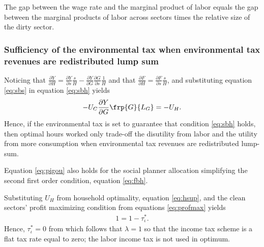 The gap between the wage rate and the marginal product of labor equals the gap between the marginal products of labor across sectors times the relative size of the dirty sector. 

\subsubsection{Sufficiency of the environmental tax when environmental tax revenues are redistributed lump sum}\label{app:incometax0}

Noticing that $\frac{\partial Y}{\partial H}= \frac{\partial Y}{\partial s}\frac{s}{H}-\frac{\partial Y}{\partial G}\frac{\partial G}{\partial s}\frac{1}{H}$ and that $\frac{\partial F}{\partial H}=\frac{\partial F}{\partial s}\frac{s}{H}$, and substituting equation \ref{eq:sbs} in equation \ref{eq:sbh} yields
\begin{align}\label{eq:pigou}
-U_C \frac{\partial Y}{\partial G}\frp{G}{L_G}=-U_H.
\end{align}
Hence, if the environmental tax is set to guarantee that condition \ref{eq:sbh} holds, then optimal hours worked only trade-off the disutility from labor and the utility from more consumption when environmental tax revenues are redistributed lump-sum.

Equation \ref{eq:pigou} also holds for the social planner allocation simplifying the second first order condition, equation \ref{eq:fbh}.


Substituting $U_H$ from household optimality, equation \ref{eq:hsup}, and the clean sectors' profit maximizing condition from equations \ref{eq:profmax} yields
\begin{align}
1=1-\tau^*_\iota.
\end{align}
Hence, $\tau^*_\iota =0$ from which follows that $\lambda =1$ so that the income tax scheme is a flat tax rate equal to zero; the labor income tax is not used in optimum.

%

